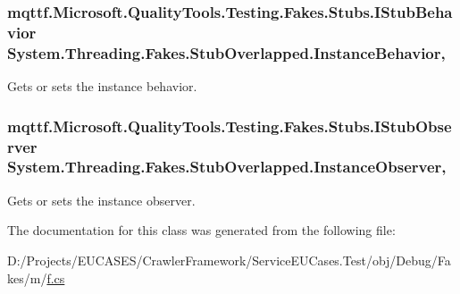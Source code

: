 \hypertarget{class_system_1_1_threading_1_1_fakes_1_1_stub_overlapped_a985c633c9555eaff3c75af85a4563d03}{
\subsubsection[{Instance\-Behavior}]{\setlength{\rightskip}{0pt plus 5cm}mqttf.\-Microsoft.\-Quality\-Tools.\-Testing.\-Fakes.\-Stubs.\-I\-Stub\-Behavior System.\-Threading.\-Fakes.\-Stub\-Overlapped.\-Instance\-Behavior\hspace{0.3cm}{\ttfamily [get]}, {\ttfamily [set]}}}\label{class_system_1_1_threading_1_1_fakes_1_1_stub_overlapped_a985c633c9555eaff3c75af85a4563d03}


Gets or sets the instance behavior.

\hypertarget{class_system_1_1_threading_1_1_fakes_1_1_stub_overlapped_a05b24c63d6ebd132f53c7b9f5108800f}{
\subsubsection[{Instance\-Observer}]{\setlength{\rightskip}{0pt plus 5cm}mqttf.\-Microsoft.\-Quality\-Tools.\-Testing.\-Fakes.\-Stubs.\-I\-Stub\-Observer System.\-Threading.\-Fakes.\-Stub\-Overlapped.\-Instance\-Observer\hspace{0.3cm}{\ttfamily [get]}, {\ttfamily [set]}}}\label{class_system_1_1_threading_1_1_fakes_1_1_stub_overlapped_a05b24c63d6ebd132f53c7b9f5108800f}


Gets or sets the instance observer.



The documentation for this class was generated from the following file\-:\begin{DoxyCompactItemize}
\item 
D\-:/\-Projects/\-E\-U\-C\-A\-S\-E\-S/\-Crawler\-Framework/\-Service\-E\-U\-Cases.\-Test/obj/\-Debug/\-Fakes/m/\hyperlink{m_2f_8cs}{f.\-cs}\end{DoxyCompactItemize}
